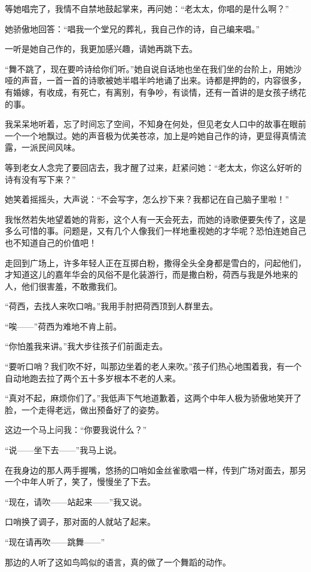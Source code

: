 \par 等她唱完了，我情不自禁地鼓起掌来，再问她：“老太太，你唱的是什么啊？”
\par 她骄傲地回答：“唱我一个堂兄的葬礼，我自己作的诗，自己编来唱。”
\par 一听是她自己作的，我更加感兴趣，请她再跳下去。
\par “舞不跳了，现在要吟诗给你们听。”她自说自话地也坐在我们坐的台阶上，用她沙哑的声音，一首一首的诗歌被她半唱半吟地诵了出来。诗都是押韵的，内容很多，有婚嫁，有收成，有死亡，有离别，有争吵，有谈情，还有一首讲的是女孩子绣花的事。
\par 我呆呆地听着，忘了时间忘了空间，不知身在何处，但见老女人口中的故事在眼前一个一个地飘过。她的声音极为优美苍凉，加上是吟她自己作的诗，更显得真情流露，一派民间风味。
\par 等到老女人念完了要回店去，我才醒了过来，赶紧问她：“老太太，你这么好听的诗有没有写下来？”
\par 她笑着摇摇头，大声说：“不会写字，怎么抄下来？我都记在自己脑子里啦！”
\par 我怅然若失地望着她的背影，这个人有一天会死去，而她的诗歌便要失传了，这是多么可惜的事。问题是，又有几个人像我们一样地重视她的才华呢？恐怕连她自己也不知道自己的价值吧！
\par 走回到广场上，许多年轻人正在互掷白粉，撒得全头全身都是雪白的，问起他们，才知道这儿的嘉年华会的风俗不是化装游行，而是撒白粉，荷西与我是外地来的人，他们很害羞，不敢撒我们。
\par “荷西，去找人来吹口哨。”我用手肘把荷西顶到人群里去。
\par “唉——”荷西为难地不肯上前。
\par “你怕羞我来讲。”我大步往孩子们前面走去。
\par “要听口哨？我们吹不好，叫那边坐着的老人来吹。”孩子们热心地围着我，有一个自动地跑去拉了两个五十多岁根本不老的人来。
\par “真对不起，麻烦你们了。”我低声下气地道歉着，这两个中年人极为骄傲地笑开了脸，一个走得老远，做出预备好了的姿势。
\par 这边一个马上问我：“你要我说什么？”
\par “说——坐下去——”我马上说。
\par 在我身边的那人两手握嘴，悠扬的口哨如金丝雀歌唱一样，传到广场对面去，那另一个中年人听了，笑了，慢慢坐了下去。
\par “现在，请吹——站起来——”我又说。
\par 口哨换了调子，那对面的人就站了起来。
\par “现在请再吹——跳舞——”
\par 那边的人听了这如鸟鸣似的语言，真的做了一个舞蹈的动作。
